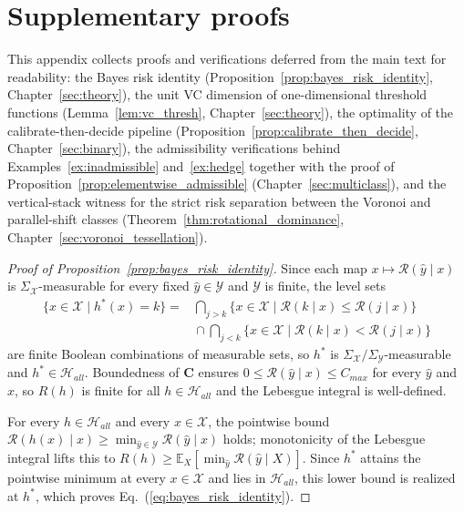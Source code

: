 \chapter{Supplementary proofs}\label{app:supplementary_proofs}

This appendix collects proofs and verifications deferred from the main text for readability: the Bayes risk identity (Proposition~\ref{prop:bayes_risk_identity}, Chapter~\ref{sec:theory}), the unit VC dimension of one-dimensional threshold functions (Lemma~\ref{lem:vc_thresh}, Chapter~\ref{sec:theory}), the optimality of the calibrate-then-decide pipeline (Proposition~\ref{prop:calibrate_then_decide}, Chapter~\ref{sec:binary}), the admissibility verifications behind Examples~\ref{ex:inadmissible} and~\ref{ex:hedge} together with the proof of Proposition~\ref{prop:elementwise_admissible} (Chapter~\ref{sec:multiclass}), and the vertical-stack witness for the strict risk separation between the Voronoi and parallel-shift classes (Theorem~\ref{thm:rotational_dominance}, Chapter~\ref{sec:voronoi_tessellation}).

\begin{proof}[Proof of Proposition~\ref{prop:bayes_risk_identity}]
Since each map $x \mapsto \mathcal{R}(\hat{y} \mid x)$ is $\Sigma_{\mathcal{X}}$-measurable for every fixed $\hat{y} \in \mathcal{Y}$ and $\mathcal{Y}$ is finite, the level sets
\begin{equation*}
\begin{split}
    \{x \in \mathcal{X} \mid h^*(x) = k\} = {}& \bigcap_{j > k}\{x \in \mathcal{X} \mid \mathcal{R}(k \mid x) \leq \mathcal{R}(j \mid x)\} \\
    & {} \cap \bigcap_{j < k}\{x \in \mathcal{X} \mid \mathcal{R}(k \mid x) < \mathcal{R}(j \mid x)\}
\end{split}
\end{equation*}
are finite Boolean combinations of measurable sets, so $h^*$ is $\Sigma_{\mathcal{X}}/\Sigma_{\mathcal{Y}}$-measurable and $h^* \in \mathcal{H}_{all}$. Boundedness of $\mathbf{C}$ ensures $0 \leq \mathcal{R}(\hat{y} \mid x) \leq C_{max}$ for every $\hat{y}$ and $x$, so $R(h)$ is finite for all $h \in \mathcal{H}_{all}$ and the Lebesgue integral is well-defined.

For every $h \in \mathcal{H}_{all}$ and every $x \in \mathcal{X}$, the pointwise bound $\mathcal{R}(h(x) \mid x) \geq \min_{\hat{y} \in \mathcal{Y}} \mathcal{R}(\hat{y} \mid x)$ holds; monotonicity of the Lebesgue integral lifts this to $R(h) \geq \mathbb{E}_X[\min_{\hat{y}} \mathcal{R}(\hat{y} \mid X)]$. Since $h^*$ attains the pointwise minimum at every $x \in \mathcal{X}$ and lies in $\mathcal{H}_{all}$, this lower bound is realized at $h^*$, which proves Eq.~(\ref{eq:bayes_risk_identity}).
\end{proof}

